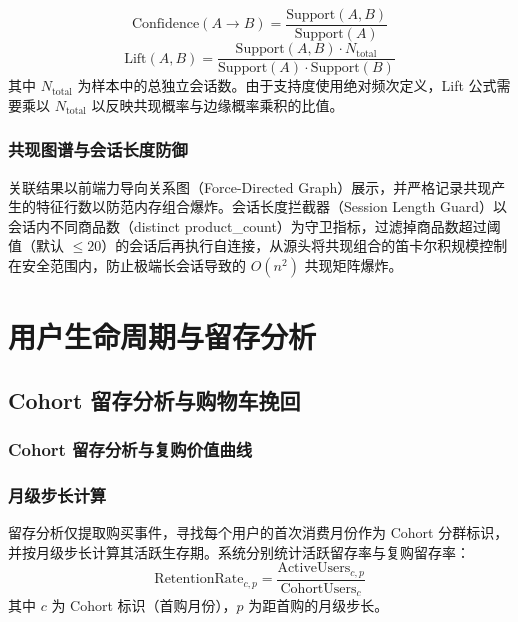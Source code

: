 \begin{equation}
    \text{Confidence}(A \to B) = \frac{\text{Support}(A, B)}{\text{Support}(A)}
\end{equation}
\begin{equation}
    \text{Lift}(A, B) = \frac{\text{Support}(A, B) \cdot N_{\text{total}}}{\text{Support}(A) \cdot \text{Support}(B)}
\end{equation}
其中 $N_{\text{total}}$ 为样本中的总独立会话数。由于支持度使用绝对频次定义，Lift 公式需要乘以 $N_{\text{total}}$ 以反映共现概率与边缘概率乘积的比值。

\subsubsection{共现图谱与会话长度防御}

关联结果以前端力导向关系图（Force-Directed Graph）展示，并严格记录共现产生的特征行数以防范内存组合爆炸。会话长度拦截器（Session Length Guard）以会话内不同商品数（distinct product\_count）为守卫指标，过滤掉商品数超过阈值（默认 $\leq 20$）的会话后再执行自连接，从源头将共现组合的笛卡尔积规模控制在安全范围内，防止极端长会话导致的 $O(n^2)$ 共现矩阵爆炸。

\section{用户生命周期与留存分析}

\subsection{Cohort 留存分析与购物车挽回}

\subsubsection{Cohort 留存分析与复购价值曲线}

\subsubsection{月级步长计算}

留存分析仅提取购买事件，寻找每个用户的首次消费月份作为 Cohort 分群标识，并按月级步长计算其活跃生存期。系统分别统计活跃留存率与复购留存率：
\begin{equation}
    \text{RetentionRate}_{c, p} = \frac{\text{ActiveUsers}_{c, p}}{\text{CohortUsers}_c}
\end{equation}
其中 $c$ 为 Cohort 标识（首购月份），$p$ 为距首购的月级步长。

